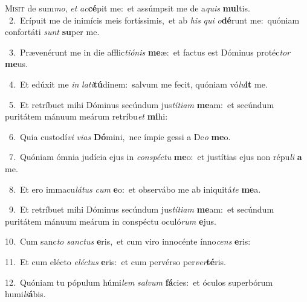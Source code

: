 \lettrine{\initial\textcolor{\initialcolor}{M}}{isit} de sum\-\textit{mo}\-, \textit{et} \textit{ac}\-\textbf{cé}pit me:~\star et assúmpsit me de a\textit{quis} \textbf{mul}\-tis.\\
{\numbfont\textcolor{\numbcolor}{~2.}}~Erípuit me de inimícis meis fortíssimis,~\dagger et ab \textit{his} \textit{qui} \textit{o}\-\textbf{dé}runt me:~\star quóniam confortáti \textit{sunt} \textbf{su}\-per me.\par
{\numbfont\textcolor{\numbcolor}{~3.}}~Prævenérunt me in die afflic\-\textit{ti}\-\textit{ó}\textit{nis} \textbf{me}\-æ:~\star et factus est Dóminus protéc\textit{tor} \textbf{me}\-us.\par
{\numbfont\textcolor{\numbcolor}{~4.}}~Et edúxit me \textit{in} \textit{la}\-\textit{ti}\textbf{tú}dinem:~\star salvum me fecit, quóniam vó\-\textit{lu}\-\textbf{it} me.\par
{\numbfont\textcolor{\numbcolor}{~5.}}~Et retríbuet mihi Dóminus secúndum jus\-\textit{tí}\-\textit{ti}\textit{am} \textbf{me}\-am:~\star et secúndum puritátem mánuum meárum retríbu\textit{et} \textbf{mi}\-hi:\par
{\numbfont\textcolor{\numbcolor}{~6.}}~Quia custodí\textit{vi} \textit{vi}\-\textit{as} \textbf{Dó}\-mini,~\star nec ímpie gessi a De\textit{o} \textbf{me}\-o.\par
{\numbfont\textcolor{\numbcolor}{~7.}}~Quóniam ómnia judícia ejus in \textit{con}\-\textit{spéc}\textit{tu} \textbf{me}\-o:~\star et justítias ejus non répu\textit{li} \textbf{a} me.\par
{\numbfont\textcolor{\numbcolor}{~8.}}~Et ero immacu\-\textit{lá}\-\textit{tus} \textit{cum} \textbf{e}\-o:~\star et observábo me ab iniquitá\textit{te} \textbf{me}\-a.\par
{\numbfont\textcolor{\numbcolor}{~9.}}~Et retríbuet mihi Dóminus secúndum jus\-\textit{tí}\-\textit{ti}\textit{am} \textbf{me}\-am:~\star et secúndum puritátem mánuum meárum in conspéctu oculó\textit{rum} \textbf{e}\-jus.\par
{\numbfont\textcolor{\numbcolor}{10.}}~Cum sanc\textit{to} \textit{sanc}\-\textit{tus} \textbf{e}\-ris,~\star et cum viro innocénte ínno\textit{cens} \textbf{e}\-ris:\par
{\numbfont\textcolor{\numbcolor}{11.}}~Et cum elécto \textit{e}\-\textit{léc}\textit{tus} \textbf{e}\-ris:~\star et cum pervérso per\-\textit{ver}\-\textbf{té}ris.\par
{\numbfont\textcolor{\numbcolor}{12.}}~Quóniam tu pópulum húmi\textit{lem} \textit{sal}\-\textit{vum} \textbf{fá}\-cies:~\star et óculos superbórum humi\-\textit{li}\-\textbf{á}bis.\par
